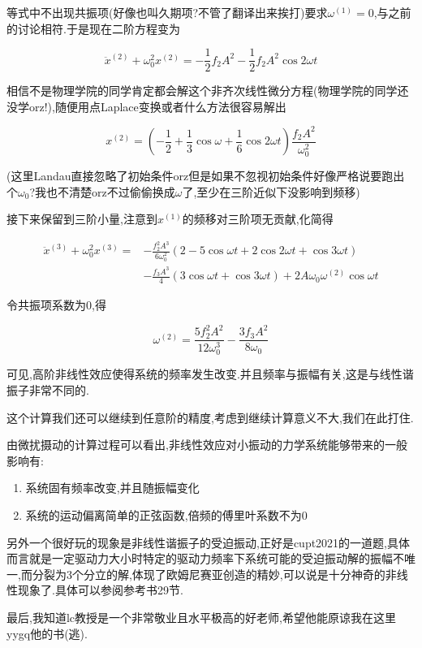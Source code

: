 \documentclass[UTF8]{article}
\begin{document}
	等式中不出现共振项(好像也叫久期项?不管了翻译出来挨打)要求$\omega^{(1)}=0$,与之前的讨论相符.于是现在二阶方程变为	
	
	\[\ddot{x}^{(2)}+\omega_0^2 x^{(2)}=-\frac{1}{2}f_2A^2-\frac{1}{2}f_2A^2\cos2\omega t\]
	
	相信不是物理学院的同学肯定都会解这个非齐次线性微分方程(物理学院的同学还没学orz!),随便用点Laplace变换或者什么方法很容易解出
	
	\[x^{(2)}=(-\frac{1}{2}+\frac{1}{3}\cos\omega+\frac{1}{6}\cos2\omega t)\frac{f_2A^2}{\omega_0^2}\]
	
	(这里Landau直接忽略了初始条件orz但是如果不忽视初始条件好像严格说要跑出个$\omega_0$?我也不清楚orz不过偷偷换成$\omega$了,至少在三阶近似下没影响到频移)
	
	接下来保留到三阶小量,注意到$x^{(1)}$的频移对三阶项无贡献,化简得
	
	\[
	\begin{aligned}
		\ddot{x}^{(3)}+\omega_0^2x^{(3)}=&-\frac{f_2^2A^3}{6\omega_0^2}(2-5\cos\omega t+2\cos2\omega t+\cos3\omega t)\\
		&-\frac{f_3A^3}{4}(3\cos\omega t+\cos3\omega t)+2A\omega_0\omega^{(2)}\cos\omega t
	\end{aligned}	
	\]
	
	令共振项系数为0,得
	
	\[\omega^{(2)}=\frac{5f_2^2A^2}{12\omega_0^3}-\frac{3f_3A^2}{8\omega_0}\]
	
	可见,高阶非线性效应使得系统的频率发生改变.并且频率与振幅有关,这是与线性谐振子非常不同的.
	
	这个计算我们还可以继续到任意阶的精度,考虑到继续计算意义不大,我们在此打住.
	
	由微扰摄动的计算过程可以看出,非线性效应对小振动的力学系统能够带来的一般影响有:
	
	\begin{enumerate}
		\item 系统固有频率改变,并且随振幅变化
		\item 系统的运动偏离简单的正弦函数,倍频的傅里叶系数不为0
	\end{enumerate}
	
	另外一个很好玩的现象是非线性谐振子的受迫振动,正好是cupt2021的一道题,具体而言就是一定驱动力大小时特定的驱动力频率下系统可能的受迫振动解的振幅不唯一,而分裂为3个分立的解,体现了欧姆尼赛亚创造的精妙,可以说是十分神奇的非线性现象了.具体可以参阅参考书\cite{Landau}29节.
	
	最后,我知道lc教授是一个非常敬业且水平极高的好老师,希望他能原谅我在这里yygq他的书(逃).
	
\end{document}
